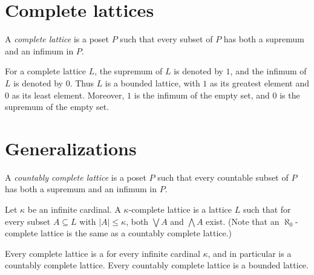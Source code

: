 \documentclass[12pt]{article}
\begin{document}
\section*{Complete lattices}

A \emph{complete lattice} is a poset $P$
such that every subset of $P$ has both a supremum and an infimum in $P$.

For a complete lattice $L$,
the supremum of $L$ is denoted by $1$,
and the infimum of $L$ is denoted by $0$.
Thus $L$ is a bounded lattice,
with $1$ as its greatest element and $0$ as its least element.
Moreover, $1$ is the infimum of the empty set,
and $0$ is the supremum of the empty set.

\section*{Generalizations}

A \emph{countably complete lattice} is a poset $P$
such that every countable subset of $P$
has both a supremum and an infimum in $P$.

Let $\kappa$ be an infinite cardinal.
A $\kappa$-complete lattice is a lattice $L$
such that for every subset $A\subseteq L$
with $|A|\le \kappa$, both $\bigvee A$ and $\bigwedge A$ exist.
(Note that an $\aleph_0$-complete lattice
is the same as a countably complete lattice.)

Every complete lattice is a 
for every infinite cardinal $\kappa$,
and in particular is a countably complete lattice.
Every countably complete lattice is a bounded lattice.


\end{document}
